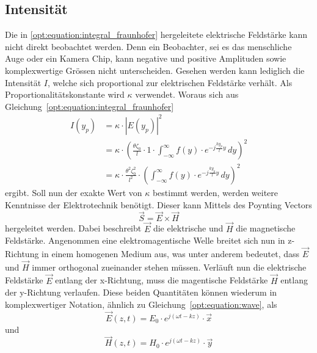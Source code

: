 \subsection{Intensität}
\label{opt:sec:intensity}
Die in \ref{opt:equation:integral_fraunhofer} hergeleitete elektrische Feldstärke kann nicht direkt beobachtet werden.
Denn ein Beobachter, sei es das menschliche Auge oder ein Kamera Chip, kann negative und positive Amplituden sowie komplexwertige Grössen nicht unterscheiden.
Gesehen werden kann lediglich die Intensität $I$, welche sich proportional zur elektrischen Feldstärke verhält.
Als Proportionalitätskonstante wird $\kappa$ verwendet.
Woraus sich aus Gleichung~\ref{opt:equation:integral_fraunhofer}
\begin{align}
I(y_p)
&=
\kappa \cdot |E(y_p)|^2
\\
&=
\kappa \cdot \left(\frac{\theta\zeta_0}{l} \cdot 1 \cdot \int_{-\infty}^{\infty}f(y)\cdot e^{-j\frac{ky_p}{l}y} \,dy\right)^2
\\
&=
\kappa \cdot \frac{\theta^2\zeta_0^2}{l^2}\cdot \left(\int_{-\infty}^{\infty}f(y)\cdot e^{-j\frac{ky_p}{l}y} \,dy\right)^2
\label{opt:equation:integral_intensity}
\end{align}
ergibt. Soll nun der exakte Wert von $\kappa$ bestimmt werden, werden weitere Kenntnisse der Elektrotechnik benötigt.
Dieser kann Mittels des Poynting Vectors
\begin{equation}
\vec{S} = \vec{E} \times \vec{H}
\label{opt:equation:poynting}
\end{equation}
hergeleitet werden.
Dabei beschreibt $\vec{E}$ die elektrische und $\vec{H}$ die magnetische Feldstärke.
Angenommen eine elektromagentische Welle breitet sich nun in z-Richtung in einem homogenen Medium aus, was unter anderem bedeutet, dass $\vec{E}$ und $\vec{H}$ immer orthogonal zueinander stehen müssen.
Verläuft nun die elektrische Feldstärke $\vec{E}$ entlang der x-Richtung, muss die magentische Feldstärke $\vec{H}$ entlang der y-Richtung verlaufen.
Diese beiden Quantitäten können wiederum in komplexwertiger Notation, ähnlich zu Gleichung~\ref{opt:equation:wave}, als
\begin{equation}
\vec{E}(z,t)
=
E_0 \cdot e^{j(\omega t-k z)} \cdot \vec{x}
\label{opt:equation:wave_electric_field}
\end{equation}
und
\begin{equation}
\vec{H}(z,t)
=
H_0 \cdot e^{j(\omega t-k z)} \cdot \vec{y}
\label{opt:equation:wave_magnetic_field}
\end{equation}
